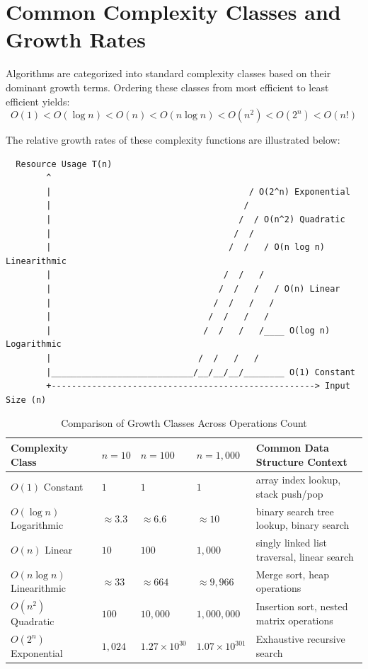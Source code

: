 \documentclass[12pt]{report}
\begin{document}
\section{Common Complexity Classes and Growth Rates}

Algorithms are categorized into standard complexity classes based on their dominant growth terms. Ordering these classes from most efficient to least efficient yields:
\[
O(1) < O(\log n) < O(n) < O(n \log n) < O(n^2) < O(2^n) < O(n!)
\]

The relative growth rates of these complexity functions are illustrated below:

\begin{verbatim}
  Resource Usage T(n)
        ^
        |                                       / O(2^n) Exponential
        |                                      /
        |                                     /  / O(n^2) Quadratic
        |                                    /  /
        |                                   /  /   / O(n log n) Linearithmic
        |                                  /  /   /
        |                                 /  /   /   / O(n) Linear
        |                                /  /   /   /
        |                               /  /   /   /
        |                              /  /   /   /____ O(log n) Logarithmic
        |                             /  /   /   /
        |____________________________/__/__/__/________ O(1) Constant
        +----------------------------------------------------> Input Size (n)
\end{verbatim}

\begin{table}[htbp]
\centering
\caption{Comparison of Growth Classes Across Operations Count}
\label{tab:growth_classes}
\begin{tabularx}{\textwidth}{X >{\raggedright\arraybackslash}p{2cm} >{\raggedright\arraybackslash}p{2cm} >{\raggedright\arraybackslash}p{2.2cm} X}
\toprule
\textbf{Complexity Class} & \textbf{$n = 10$} & \textbf{$n = 100$} & \textbf{$n = 1,000$} & \textbf{Common Data Structure Context} \\
\midrule
$O(1)$ Constant & $1$ & $1$ & $1$ & array index lookup, stack push/pop \\
$O(\log n)$ Logarithmic & $\approx 3.3$ & $\approx 6.6$ & $\approx 10$ & binary search tree lookup, binary search \\
$O(n)$ Linear & $10$ & $100$ & $1,000$ & singly linked list traversal, linear search \\
$O(n \log n)$ Linearithmic & $\approx 33$ & $\approx 664$ & $\approx 9,966$ & Merge sort, heap operations \\
$O(n^2)$ Quadratic & $100$ & $10,000$ & $1,000,000$ & Insertion sort, nested matrix operations \\
$O(2^n)$ Exponential & $1,024$ & $1.27 \times 10^{30}$ & $1.07 \times 10^{301}$ & Exhaustive recursive search \\
\bottomrule
\end{tabularx}
\end{table}
\end{document}
